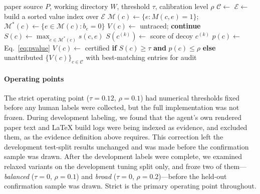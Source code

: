 \documentclass[preprint,12pt,authoryear]{elsarticle}
\begin{document}
\begin{algorithm}[t]
\caption{Claim-to-evidence checker for one submission}
\label{alg:checker}
\footnotesize
\begin{algorithmic}[1]
\Require paper source $P$, working directory $W$, threshold $\tau$, calibration level $\rho$
\State $\mathcal{C}\gets$  
\State $\mathcal{E}\gets$  
\State build a sorted value index over $\mathcal{E}$ 
  \State $\mathcal{M}(c)\gets\{e: M(c,e)=1\}$;\ \ $\mathcal{M}^{*}(c)\gets\{e\in\mathcal{M}(c): b_e=0\}$
   \State $V(c)\gets$ untraced; \textbf{continue} \EndIf
  \State $S(c)\gets\max_{e\in\mathcal{M}^{*}(c)} s(c,e)$ 
   \State $S(c^{(k)})\gets$ score of decoy $c^{(k)}$  \EndFor
  \State $p(c)\gets$ Eq.~\eqref{eq:pvalue}
  \State $V(c)\gets$ certified \textbf{if} $S(c)\ge\tau$ \textbf{and} $p(c)\le\rho$ \textbf{else} unattributed
\EndFor
\State \Return $\{V(c)\}_{c\in\mathcal{C}}$ with best-matching entries for audit
\end{algorithmic}
\end{algorithm}


\paragraph{Operating points} The strict operating point ($\tau=0.12$, $\rho=0.1$) had numerical thresholds fixed before any human labels were collected, but the full implementation was not frozen. During development labeling, we found that the agent's own rendered paper text and \LaTeX{} build logs were being indexed as evidence, and excluded them, as the evidence definition above requires. This correction left the development test-split results unchanged and was made before the confirmation sample was drawn. After the development labels were complete, we examined relaxed variants on the development tuning split only, and froze two of them---\emph{balanced} ($\tau=0$, $\rho=0.1$) and \emph{broad} ($\tau=0$, $\rho=0.2$)---before the held-out confirmation sample was drawn. Strict is the primary operating point throughout.
\end{document}
